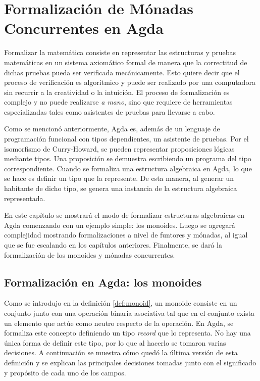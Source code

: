 \chapter{Formalización de Mónadas Concurrentes en Agda}\label{chapter:form} 

Formalizar la matemática consiste en representar las estructuras y pruebas matemáticas en un sistema axiomático formal de manera que la correctitud de dichas pruebas pueda ser verificada mecánicamente. Esto quiere decir que el proceso de verificación es algorítmico y puede ser realizado por una computadora sin recurrir a la creatividad o la intuición. El proceso de formalización es complejo y no puede realizarse \textit{a mano}, sino que requiere de herramientas especializadas tales como asistentes de pruebas para llevarse a cabo. 

Como se mencionó anteriormente, Agda es, además de un lenguaje de programación funcional con tipos dependientes, un asistente de pruebas. Por el isomorfismo de Curry-Howard, se pueden representar proposiciones lógicas mediante tipos. Una proposición se demuestra escribiendo un programa del tipo correspondiente. Cuando se formaliza una estructura algebraica en Agda, lo que se hace es definir un tipo que la represente. De esta manera, al generar un habitante de dicho tipo, se genera una instancia de la estructura algebraica representada. 

En este capítulo se mostrará el modo de formalizar estructuras algebraicas en Agda comenzando con un ejemplo simple: los monoides. Luego se agregará complejidad mostrando formalizaciones a nivel de funtores y mónadas, al igual que se fue escalando en los capítulos anteriores. Finalmente, se dará la formalización de los monoides y mónadas concurrentes.

\section{Formalización en Agda: los monoides}\label{form:monoids}

Como se introdujo en la definición \ref{def:monoid}, un monoide consiste en un conjunto junto con una operación binaria asociativa tal que en el conjunto exista un elemento que actúe como neutro respecto de la operación. En Agda, se formaliza este concepto definiendo un tipo \textit{record} que lo representa. No hay una única forma de definir este tipo, por lo que al hacerlo se tomaron varias decisiones. A continuación se muestra cómo quedó la última versión de esta definición y se explican las principales decisiones tomadas junto con el significado y propósito de cada uno de los campos. 

